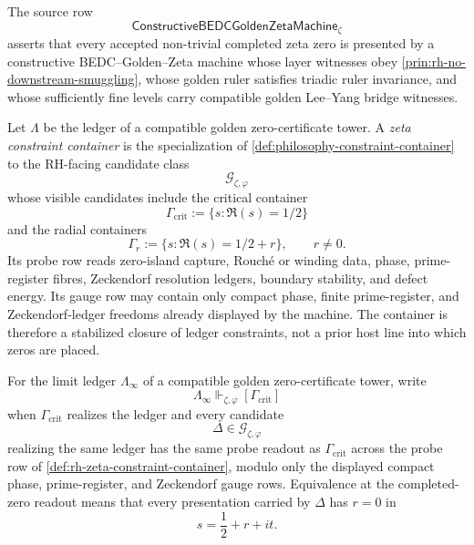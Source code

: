\begin{definition}
\label{def:rh-constructive-bedc-golden-zeta-source-row}
The source row
$$
\mathsf{ConstructiveBEDCGoldenZetaMachine}_{\zeta}
$$
asserts that every accepted non-trivial completed zeta zero is presented
by a constructive BEDC--Golden--Zeta machine whose layer witnesses obey
\autoref{prin:rh-no-downstream-smuggling}, whose golden ruler satisfies
triadic ruler invariance, and whose sufficiently fine levels carry
compatible golden Lee--Yang bridge witnesses.
\end{definition}

\begin{definition}
\label{def:rh-zeta-constraint-container}
Let $\Lambda$ be the ledger of a compatible golden zero-certificate
tower.  A \emph{zeta constraint container} is the specialization of
\autoref{def:philosophy-constraint-container} to the RH-facing candidate
class
$$
\mathcal G_{\zeta,\varphi}
$$
whose visible candidates include the critical container
$$
\Gamma_{\mathrm{crit}}
:=
\{s:\Re(s)=1/2\}
$$
and the radial containers
$$
\Gamma_r
:=
\{s:\Re(s)=1/2+r\},
\qquad
r\ne0.
$$
Its probe row reads zero-island capture, Rouch\'e or winding data,
phase, prime-register fibres, Zeckendorf resolution ledgers, boundary
stability, and defect energy.  Its gauge row may contain only compact
phase, finite prime-register, and Zeckendorf-ledger freedoms already
displayed by the machine.  The container is therefore a stabilized
closure of ledger constraints, not a prior host line into which zeros
are placed.
\end{definition}

\begin{definition}
\label{def:rh-zeta-critical-container-forcing}
For the limit ledger $\Lambda_{\infty}$ of a compatible golden
zero-certificate tower, write
$$
\Lambda_{\infty}
\Vdash_{\zeta,\varphi}
[\Gamma_{\mathrm{crit}}]
$$
when $\Gamma_{\mathrm{crit}}$ realizes the ledger and every candidate
$$
\Delta\in\mathcal G_{\zeta,\varphi}
$$
realizing the same ledger has the same probe readout as
$\Gamma_{\mathrm{crit}}$ across the probe row of
\autoref{def:rh-zeta-constraint-container}, modulo only the displayed
compact phase, prime-register, and Zeckendorf gauge rows.  Equivalence
at the completed-zero readout means that every presentation carried by
$\Delta$ has $r=0$ in
$$
s=\frac12+r+it.
$$
\end{definition}

